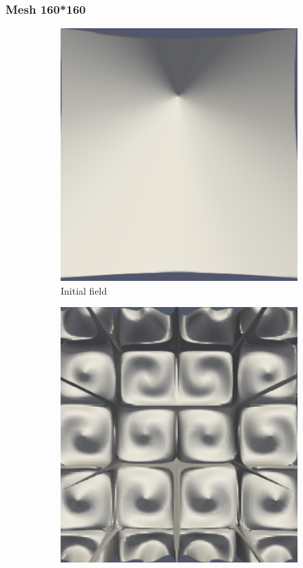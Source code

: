 \documentclass{article}
\begin{document}
\subsubsection{Mesh 160*160}
\begin{figure}[hbt!]
  \begin{subfigure}{0.4\textwidth}
        \centering
        \includegraphics[width=\textwidth]{Figures/e-4 160x160/for n 1.png}
        \caption{Initial field}
  \end{subfigure}
  \hfill
  \begin{subfigure}{0.4\textwidth}
        \centering
        \includegraphics[width=\textwidth]{Figures/e-4 160x160/for n 10.png}

\end{subfigure}
\end{figure}
\end{document}
